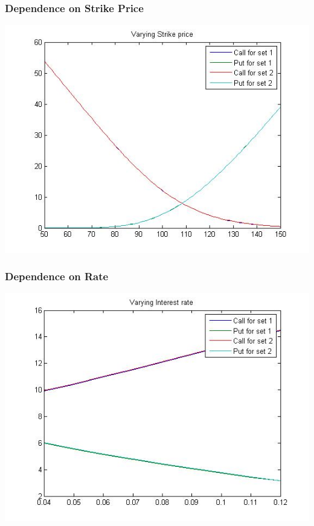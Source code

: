 \documentclass[12pt]{article}
\begin{document}
        \subsubsection*{Dependence on Strike Price}
    \begin{center}
      \includegraphics[width=6in]{strike.jpg}
    \end{center}
        \subsubsection*{Dependence on Rate}
    \begin{center}
      \includegraphics[width=6in]{rate.jpg}
    \end{center}
\end{document}
